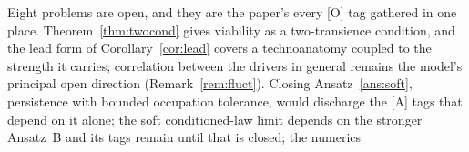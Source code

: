 Eight problems are open, and they are the paper's every [O] tag
gathered in one place. Theorem~\ref{thm:twocond} gives viability as a
two-transience condition, and the lead form of Corollary~\ref{cor:lead}
covers a technoanatomy coupled to the strength it carries; correlation
between the drivers in general remains the model's principal open
direction (Remark~\ref{rem:fluct}).
Closing Ansatz~\ref{ans:soft}, persistence with bounded occupation tolerance, would discharge the [A] tags that depend on it alone; the soft conditioned-law limit depends on the stronger Ansatz~B and its tags remain until that is closed; the numerics
